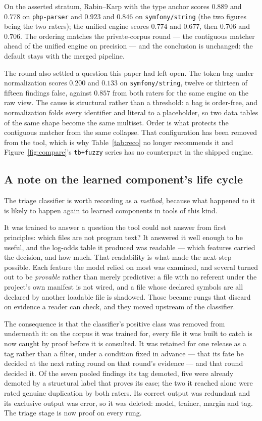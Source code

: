 \documentclass[10pt,a4paper]{article}
\begin{document}
On the asserted stratum, Rabin--Karp with the type anchor scores $0.889$ and
$0.778$ on \texttt{php-parser} and $0.923$ and $0.846$ on \texttt{symfony/string}
(the two figures being the two raters); the unified engine scores $0.774$ and
$0.677$, then $0.706$ and $0.706$. The ordering matches the private-corpus
round --- the contiguous matcher ahead of the unified engine on precision --- and
the conclusion is unchanged: the default stays with the merged pipeline.

The round also settled a question this paper had left open. The token bag under
normalization scores $0.200$ and $0.133$ on \texttt{symfony/string}, twelve or
thirteen of fifteen findings false, against $0.857$ from both raters for the same
engine on the raw view. The cause is structural rather than a threshold: a bag is
order-free, and normalization folds every identifier and literal to a
placeholder, so two data tables of the same shape become the same multiset. Order
is what protects the contiguous matcher from the same collapse. That
configuration has been removed from the tool, which is why Table~\ref{tab:reco}
no longer recommends it and Figure~\ref{fig:compare}'s \texttt{tb+fuzzy} series
has no counterpart in the shipped engine.

\subsection{A note on the learned component's life cycle}
The triage classifier is worth recording as a \emph{method}, because what happened to it is likely
to happen again to learned components in tools of this kind.

It was trained to answer a question the tool could not answer from first principles: which files
are not program text? It answered it well enough to be useful, and the log-odds table it produced
was readable --- which features carried the decision, and how much. That readability is what made
the next step possible. Each feature the model relied on most was examined, and several turned out
to be \emph{provable} rather than merely predictive: a file with no referent under the project's
own manifest is not wired, and a file whose declared symbols are all declared by another loadable
file is shadowed. Those became rungs that discard on evidence a reader can check, and they moved
upstream of the classifier.

The consequence is that the classifier's positive class was removed from underneath it: on the
corpus it was trained for, every file it was built to catch is now caught by proof before it is
consulted. It was retained for one release as a tag rather than a filter, under a condition fixed in
advance --- that its fate be decided at the next rating round on that round's evidence --- and that
round decided it. Of the seven pooled findings its tag demoted, five were already demoted by a
structural label that proves its case; the two it reached alone were rated genuine duplication by
both raters. Its correct output was redundant and its exclusive output was error, so it was deleted:
model, trainer, margin and tag. The triage stage is now proof on every rung.
\end{document}
